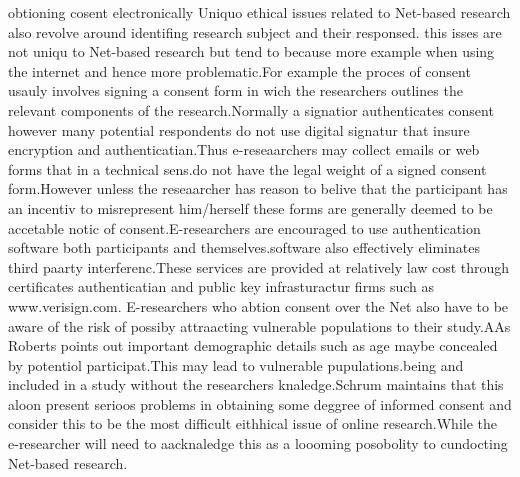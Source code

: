 \documentclass[a4paper]{book}
\begin{document}
obtioning cosent electronically
Uniquo ethical issues related to Net-based research also revolve around identifing research subject and their responsed. this isses are not uniqu to Net-based research but tend to because more example when using the internet and hence more problematic.For example the proces of consent usauly involves signing a consent form in wich the researchers outlines the relevant components of the research.Normally a signatior authenticates consent however many potential respondents do not use digital signatur that insure encryption and authenticatian.Thus e-reseaarchers may collect emails or web forms that in a technical sens.do not have the legal weight of a signed consent form.However unless the reseaarcher has reason to belive that the participant has an incentiv to misrepresent him/herself these forms are generally deemed to be accetable notic of consent.E-researchers are encouraged to use authentication software both participants and themselves.software also effectively eliminates third paarty interferenc.These services are provided at relatively law cost through certificates authenticatian and public key infrasturactur firms such as www.verisign.com.
E-researchers who abtion consent over the Net also have to be aware of the risk of possiby attraacting vulnerable populations to their study.AAs Roberts points out important demographic details such as age maybe concealed by potentiol participat.This may lead to vulnerable pupulations.being and included in a study without the researchers knaledge.Schrum maintains that this aloon present serioos problems in obtaining some deggree of informed consent and consider this to be the most difficult eithhical issue of online research.While the e-researcher will need to aacknaledge this as a loooming posobolity to cundocting Net-based research.    
 
\end{document}
